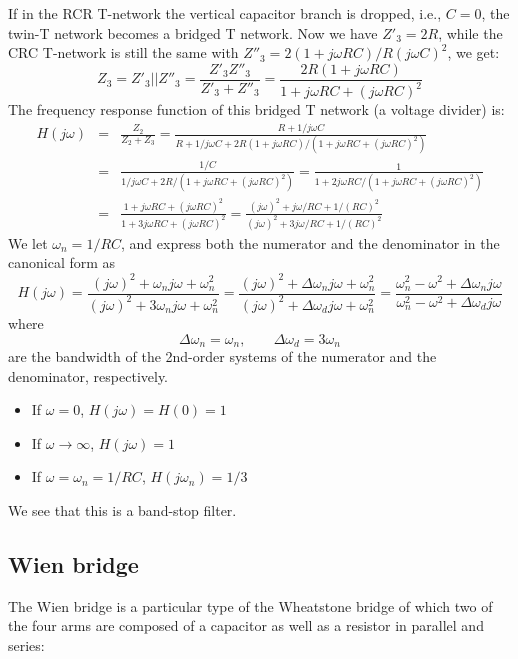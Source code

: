 If in the RCR T-network the vertical capacitor branch is dropped, 
i.e., $C=0$, the twin-T network becomes a bridged T network. Now
we have $Z'_3=2R$, while the CRC T-network is still the same with 
$Z''_3=2(1+j\omega RC)/R(j\omega C)^2$, we get:
\[
  Z_3=Z'_3||Z''_3=\frac{Z'_3 Z''_3}{Z'_3+Z''_3}
  =\frac{2R(1+j\omega RC)}{1+j\omega RC+(j\omega RC)^2}
\]
The frequency response function of this bridged T network (a voltage 
divider) is:
\begin{eqnarray}
  H(j\omega)&=&\frac{Z_2}{Z_2+Z_3}=\frac{R+1/j\omega C}{R+1/j\omega C+2R(1+j\omega RC)/(1+j\omega RC+(j\omega RC)^2)}
  \nonumber \\
  &=&\frac{1/C}{1/j\omega C+2R/(1+j\omega RC+(j\omega RC)^2)}
  =\frac{1}{1+2j\omega RC/(1+j\omega RC+(j\omega RC)^2)}
  \nonumber \\
  &=&\frac{1+j\omega RC+(j\omega RC)^2}{1+3j\omega RC+(j\omega RC)^2}
  =\frac{(j\omega)^2+j\omega /RC+1/(RC)^2}{(j\omega)^2+3j\omega /RC+1/(RC)^2}
  \nonumber
\end{eqnarray}
We let $\omega_n=1/RC$, and express both the numerator and the
denominator in the canonical form as
\[
H(j\omega)=\frac{(j\omega)^2+\omega_n j\omega +\omega_n^2}{(j\omega)^2+3\omega_nj\omega +\omega_n^2}
=\frac{(j\omega)^2+\Delta\omega_n j\omega+\omega_n^2}{(j\omega)^2+\Delta\omega_dj\omega +\omega_n^2}
=\frac{\omega_n^2-\omega^2+\Delta\omega_n j\omega }{\omega_n^2-\omega^2+\Delta\omega_dj\omega}
\]
where 
\[
\Delta\omega_n=\omega_n,\;\;\;\;\;\;\;\Delta\omega_d=3\omega_n
\]
are the bandwidth of the 2nd-order systems of the numerator and the
denominator, respectively. 
\begin{itemize}
\item If $\omega=0$, $H(j\omega)=H(0)=1$
\item If $\omega\rightarrow \infty$, $H(j\omega)=1$
\item If $\omega=\omega_n=1/RC$, $H(j\omega_n)=1/3$
\end{itemize}
We see that this is a band-stop filter.


\subsection*{Wien bridge}

The Wien bridge is a particular type of the Wheatstone bridge of which
two of the four arms are composed of a capacitor as well as a resistor
in parallel and series:


